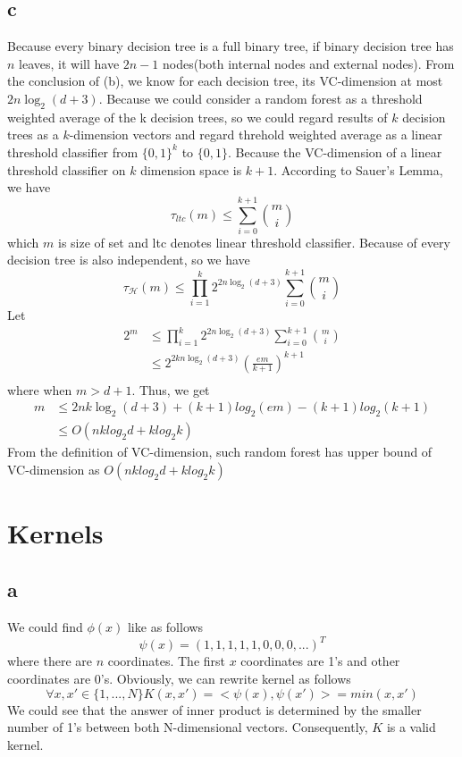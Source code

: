 \documentclass{article}
\begin{document}
	\subsection{c}
	Because every binary decision tree is a full binary tree, if binary decision tree has $n$ leaves, it will have $2n-1$ nodes(both internal nodes and external nodes). From the conclusion of (b), we know for each decision tree, its VC-dimension at most $2n\log_2(d+3)$. Because we could consider a random forest as a threshold weighted average of the k decision trees, so we could regard results of $k$ decision trees as a $k$-dimension vectors and regard threhold weighted average as a linear threshold classifier from $\{0,1\}^k$ to $\{0, 1\}$. Because the VC-dimension of a linear threshold classifier on $k$ dimension space is  $k+1$. According to Sauer's Lemma, we have
	$$
	\tau_{ltc}(m) \leq \sum_{i=0}^{k+1}\binom{m}{i}
	$$
	which $m$ is size of set and ltc denotes linear threshold classifier.
	Because of every decision tree is also independent, so we have
	$$
	\tau_{\mathcal{H}}(m) \leq \prod_{i=1}^{k}2^{2n\log_2{(d+3)}}\sum_{i=0}^{k+1}\binom{m}{i}
	$$
	Let
	$$
	\begin{aligned}
	2^m &\leq \prod_{i=1}^{k}2^{2n\log_2{(d+3)}}\sum_{i=0}^{k+1}\binom{m}{i}\\
	&\leq 2^{2kn\log_2{(d+3)}}(\frac{em}{k+1})^{k+1}\\
	\end{aligned}
	$$
	where when $m > d+1$.
	Thus, we get
	$$
	\begin{aligned}
	m &\leq 2nk\log_2{(d+3)}+(k+1)log_2(em)-(k+1)log_2(k+1)\\
	&\leq O(nklog_2d+klog_2k)
	\end{aligned}
	$$
	From the definition of VC-dimension, such random forest has upper bound of VC-dimension as $O(nklog_2d+klog_2k)$

	\section{Kernels}
	\subsection{a}
	We could find $\phi(x)$ like as follows
	$$
	\psi(x) = (1,1,1,1,1,0,0,0,...)^T
	$$
	where there are $n$ coordinates. The first $x$ coordinates are 1's and other coordinates are 0's.
	Obviously, we can rewrite kernel as follows
	$$
	\forall x,x' \in \{1,...,N\}K(x,x')= <\psi(x),\psi(x')> = min(x,x')
	$$
	We could see that the answer of inner product is determined by the smaller number of 1's between both N-dimensional vectors.
	Consequently, $K$ is a valid kernel.
\end{document}
